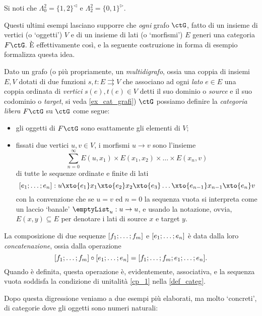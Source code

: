 \begin{example}
	Si noti che \(\Lambda^2_0=\{1,2\}^\lhd\) e \(\Lambda^2_2=\{0,1\}^\rhd\).
\end{example}
Questi ultimi esempi lasciano supporre che \emph{ogni} grafo \(\ctG\), fatto di un insieme di vertici (o `oggetti') \(V\) e di un insieme di lati (o `morfismi') \(E\) generi una categoria \(F\ctG\). \`E effettivamente così, e la seguente costruzione in forma di esempio formalizza questa idea.
\begin{example}\label{ex_cat_libera}
	Dato un grafo (o più propriamente, un \emph{multidigrafo}, ossia una coppia di insiemi \(E,V\) dotati di due funzioni \(s,t : E\rightrightarrows V\) che associano ad ogni \emph{lato} \(e\in E\) una coppia ordinata di \emph{vertici} \(s(e),t(e)\in V\) detti il suo dominio o \emph{source} e il suo codominio o \emph{target}, si veda \ref{ex_cat_grafi}) \(\ctG\) possiamo definire la \emph{categoria libera} \(F\ctG\) su \(\ctG\) come segue:
	\begin{itemize}
		\item gli oggetti di \(F\ctG\) sono esattamente gli elementi di \(V\);
		\item fissati due vertici \(u,v\in V\), i morfismi \(u\to v\) sono l'insieme
		      \[\sum_{n=0}^\infty E(u,x_1)\times E(x_1,x_2)\times\dots\times E(x_n,v)\]
		      di tutte le sequenze ordinate e finite di lati
		      \[ [\tup en;] : u \xto{e_1} x_1 \xto{e_2} x_2\xto{e_3} \dots\xto{e_{n-1}} x_{n-1}\xto{e_n} v\]
		      con la convenzione che se \(u=v\) ed \(n=0\) la sequenza vuota si interpreta come un laccio `banale' \(\emptyList_u : u\to u\), e usando la notazione, ovvia, \(E(x,y)\subseteq E\) per denotare i lati di source \(x\) e target \(y\).
	\end{itemize}
	La composizione di due sequenze \([\tup fm;]\) e \([\tup en;]\) è data dalla loro \emph{concatenazione}, ossia dalla operazione
	\[[\tup fm;]\cmp[\tup en;] = [\tup fm;;\tup en;].\]
	Quando è definita, questa operazione è, evidentemente, associativa, e la sequenza vuota soddisfa la condizione di unitalità \ref{cp_1} nella \ref{def_categ}.
\end{example}
Dopo questa digressione veniamo a due esempi più elaborati, ma molto `concreti', di categorie dove gli oggetti sono numeri naturali:
